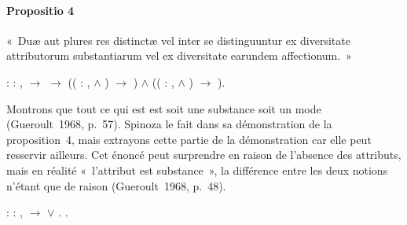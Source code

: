 \documentclass[12pt]{report}
\begin{document}
\paragraph{Propositio 4}

 « Duæ aut plures res distinctæ vel inter se distinguuntur ex
  diversitate attributorum substantiarum vel ex diversitate earundem
  affectionum. » \begin{coqdoccode}
\coqdocemptyline
\coqdocindent{1.00em}
 :\coqdoceol
\coqdocindent{2.00em}
\coqdockw{\ensuremath{\forall}}  : , \coqdoceol
\coqdocindent{3.00em}
  \ensuremath{\rightarrow} \coqdoceol
\coqdocindent{3.00em}
  \ensuremath{\rightarrow}\coqdoceol
\coqdocindent{3.00em}
((\coqdoctac{\ensuremath{\exists}} : , \coqdoceol
\coqdocindent{4.50em}
   \ensuremath{\land}   ) \coqdoceol
\coqdocindent{4.50em}
\ensuremath{\rightarrow}   ) \ensuremath{\land}\coqdoceol
\coqdocindent{3.00em}
((\coqdoctac{\ensuremath{\exists}} : , \coqdoceol
\coqdocindent{4.50em}
   \ensuremath{\land}   ) \coqdoceol
\coqdocindent{4.50em}
\ensuremath{\rightarrow}   ).\coqdoceol
\coqdocemptyline
\end{coqdoccode}
Montrons que tout ce qui est est soit une substance soit un mode
    (Gueroult 1968, p. 57). Spinoza le fait dans sa démonstration de la
    proposition 4, mais extrayons cette partie de la démonstration car
    elle peut resservir ailleurs. Cet énoncé peut surprendre en raison
    de l'absence des attributs, mais en réalité « l'attribut est
    substance », la différence entre les deux notions n'étant que de
    raison (Gueroult 1968, p. 48). \begin{coqdoccode}
\coqdocemptyline
\coqdocindent{1.00em}
 : \coqdoceol
\coqdocindent{2.00em}
\coqdockw{\ensuremath{\forall}} : , \coqdoceol
\coqdocindent{3.00em}
  \ensuremath{\rightarrow} \coqdoceol
\coqdocindent{3.00em}
  \ensuremath{\lor}  .\coqdoceol
\coqdocemptyline
\coqdocindent{1.00em}
.\coqdoceol
\coqdocemptyline
\end{coqdoccode}
\end{document}
